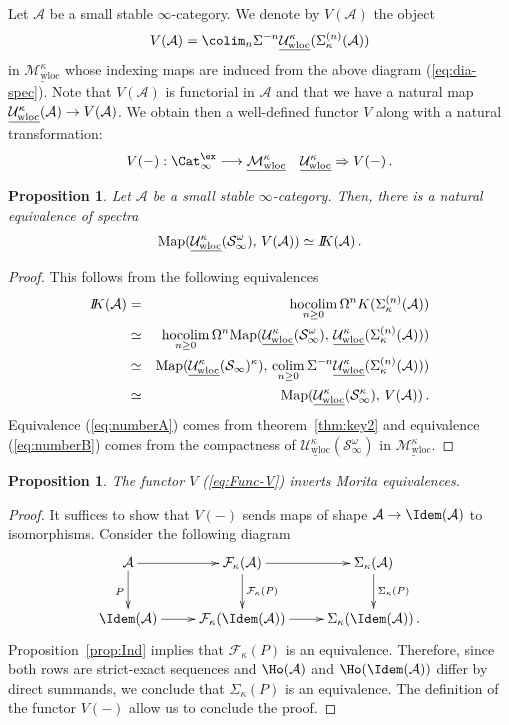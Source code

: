 \documentclass{amsart}
\renewcommand{\to}{\mathchoice{\longrightarrow}{\rightarrow}{\rightarrow}{\rightarrow}}
\newcommand{\cA}{{\mathcal A}}
\newcommand{\cF}{{\mathcal F}}
\newcommand{\cM}{{\mathcal M}}
\newcommand{\cU}{{\mathcal U}}
\let\catsymbfont\mathcal
\newcommand{\aA}{{\catsymbfont{A}}}
\newcommand{\aS}{{\catsymbfont{S}}}
\newcommand{\bbK}{I\mspace{-6.mu}K}
\newcommand{\stabcat}{\Cat_\i^{\ex}}
\newcommand{\Map}{\mathrm{Map}}%
\newcommand{\ispec}{\aS_{\infty}}
\newcommand{\too}{\longrightarrow}%
\renewcommand{\i}{\infty}
\newcommand{\uwMotloc}{\underline{\cM_{\mathrm{wloc}}^\kappa}}
\newcommand{\uwUloc}{\underline{\cU_{\mathrm{wloc}}^\kappa}}
\newcommand{\kcone}{\cF_{\kappa}}
\newcommand{\ksusp}{\Sigma_{\kappa}}
\numberwithin{equation}{section}
\newtheorem{proposition}[equation]{Proposition}
\theoremstyle{definition}
\begin{document}
Let $\cA$ be a small stable $\i$-category.  We denote by $V(\cA)$ the object
\[
V(\aA) = \colim_n\Sigma^{-n}\uwUloc(\ksusp^{(n)}(\cA))
\]
in $\uwMotloc$ whose indexing maps are induced from the above diagram
(\ref{eq:dia-spec}). Note that $V(\cA)$ is functorial in $\cA$ and
that we have a natural map $\uwUloc(\cA) \to V(\cA)$. We obtain then a
well-defined functor $V$ along with a natural transformation:
\begin{eqnarray}\label{eq:Func-V}
V(-): \stabcat \too \uwMotloc && \uwUloc \Rightarrow V(-)\,.
\end{eqnarray}
\begin{proposition}\label{prop:negK}
Let $\cA$ be a small stable $\i$-category. Then, there is a natural
equivalence of spectra
$$ \Map(\uwUloc(\ispec^\omega),\, V(\cA)) \simeq \bbK(\cA)\,.$$
\end{proposition}
\begin{proof}
This follows from the following equivalences
\begin{eqnarray}
\bbK(\cA) & = & \underset{n \geq 0}{\mathrm{hocolim}}\, \Omega^n
K(\ksusp^{(n)}(\cA))  \nonumber \\ 
& \simeq & \underset{n \geq 0}{\mathrm{hocolim}}\, \Omega^n \Map(\uwUloc(\ispec^\omega),\, \uwUloc(\ksusp^{(n)}(\cA))) \label{eq:numberA}\\
& \simeq & \Map(\uwUloc(\ispec)^\kappa),\, \underset{n \geq
0}{\mathrm{colim}}\, \Sigma^{-n} \uwUloc(\ksusp^{(n)}(\cA))) \label{eq:numberB}\\
& \simeq &  \Map(\uwUloc(\ispec^\kappa),\, V(\cA))\,. \nonumber
\end{eqnarray}
Equivalence (\ref{eq:numberA}) comes from theorem~\ref{thm:key2} and equivalence (\ref{eq:numberB}) comes from the compactness of $\uwUloc(\ispec^\omega)$ in $\uwMotloc$.
\end{proof}
\begin{proposition}\label{prop:Mor-V}
The functor $V$ (\ref{eq:Func-V}) inverts Morita equivalences.
\end{proposition}
\begin{proof}
It suffices to show that $V(-)$ sends maps of shape
$\cA \to \Idem(\cA)$ to isomorphisms.  Consider the following diagram
$$
\xymatrix{
\cA \ar[d]_P \ar[r] & \kcone (\cA) \ar[d]^{\kcone(P)} \ar[r] & \ksusp(\cA) \ar[d]^{\ksusp(P)} \\
\Idem(\cA) \ar[r] & \kcone(\Idem(\cA)) \ar[r] & \ksusp(\Idem(\cA))\,.
}
$$
Proposition~\ref{prop:Ind} implies that $\kcone(P)$ is an
equivalence. Therefore, since both rows are strict-exact sequences and
$\Ho(\cA)$ and $\Ho(\Idem(\cA))$ differ by direct summands, we
conclude that $\ksusp(P)$ is an equivalence. The definition of the
functor $V(-)$ allow us to conclude the proof.
\end{proof}
\end{document}
